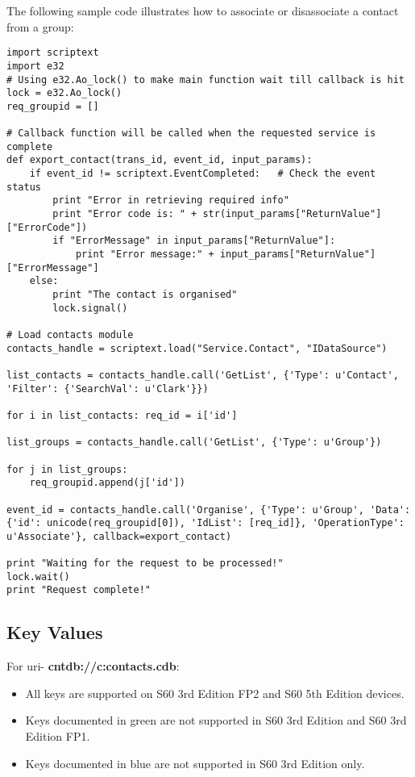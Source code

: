 The following sample code illustrates how to associate or disassociate a contact from a group:

\begin{verbatim}
import scriptext
import e32
# Using e32.Ao_lock() to make main function wait till callback is hit
lock = e32.Ao_lock()
req_groupid = []

# Callback function will be called when the requested service is complete
def export_contact(trans_id, event_id, input_params):
    if event_id != scriptext.EventCompleted:   # Check the event status
        print "Error in retrieving required info"
        print "Error code is: " + str(input_params["ReturnValue"]["ErrorCode"])
        if "ErrorMessage" in input_params["ReturnValue"]:
            print "Error message:" + input_params["ReturnValue"]["ErrorMessage"]
    else:
        print "The contact is organised"
        lock.signal()

# Load contacts module
contacts_handle = scriptext.load("Service.Contact", "IDataSource")

list_contacts = contacts_handle.call('GetList', {'Type': u'Contact', 'Filter': {'SearchVal': u'Clark'}})

for i in list_contacts: req_id = i['id']

list_groups = contacts_handle.call('GetList', {'Type': u'Group'})

for j in list_groups:
    req_groupid.append(j['id'])

event_id = contacts_handle.call('Organise', {'Type': u'Group', 'Data': {'id': unicode(req_groupid[0]), 'IdList': [req_id]}, 'OperationType': u'Associate'}, callback=export_contact)

print "Waiting for the request to be processed!"
lock.wait()
print "Request complete!"
\end{verbatim}

\subsection{Key Values}
\label{subsec:contactkeyval}

For uri- {\bf cntdb://c:contacts.cdb}:

\begin{itemize}
\item All keys are supported on S60 3rd Edition FP2 and S60 5th Edition devices.
\item Keys documented in {\color{green}green} are not supported in S60 3rd Edition and S60 3rd Edition FP1.
\item Keys documented in {\color{blue}blue} are not supported in S60 3rd Edition only.
\end{itemize}

